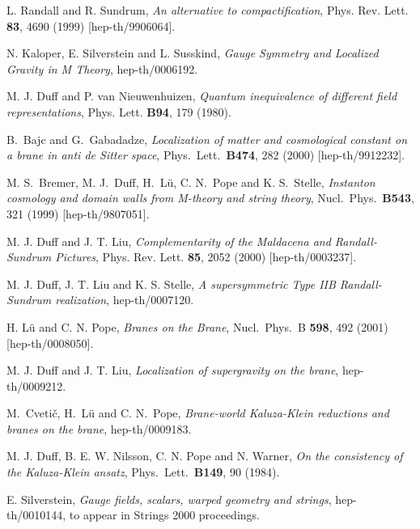\documentclass[a4paper,12pt]{article}
\begin{document}
\begin{thebibliography}{99}


L. Randall and R. Sundrum,
{\sl An alternative to compactification},
Phys. Rev. Lett. {\bf 83}, 4690 (1999) [hep-th/9906064].

N. Kaloper, E. Silverstein and L. Susskind,
{\sl Gauge Symmetry and Localized Gravity in M Theory},
hep-th/0006192.

M. J. Duff and P. van Nieuwenhuizen,
{\sl Quantum inequivalence of different field representations},
Phys. Lett. {\bf B94}, 179 (1980).

B.~Bajc and G.~Gabadadze,
{\sl Localization of matter and cosmological constant on a brane in anti
de Sitter space},
Phys.\ Lett.\ {\bf B474}, 282 (2000) [hep-th/9912232].

M. S.~Bremer, M. J.~Duff, H.~L\"u, C. N.~Pope and K. S.~Stelle,
{\sl Instanton cosmology and domain walls from M-theory and string theory},
Nucl.\ Phys.\ {\bf B543}, 321 (1999) [hep-th/9807051].

M. J. Duff and J. T. Liu,
{\sl Complementarity of the Maldacena and Randall-Sundrum Pictures},
Phys. Rev. Lett. {\bf 85}, 2052 (2000) [hep-th/0003237].

M. J. Duff, J. T. Liu and K. S. Stelle,
{\sl A supersymmetric Type IIB Randall-Sundrum realization},
hep-th/0007120.

H. L\"u and C. N. Pope, {\sl Branes on the Brane},
Nucl.\ Phys.\ B {\bf 598}, 492 (2001) [hep-th/0008050].

M. J. Duff and J. T. Liu,
{\sl Localization of supergravity on the brane},
hep-th/0009212.

M.~Cveti\v{c}, H.~L\"u and C. N.~Pope,
{\sl Brane-world Kaluza-Klein reductions and branes on the brane},
hep-th/0009183.

M. J. Duff, B. E. W. Nilsson, C. N. Pope and N. Warner,
{\sl On the consistency of the Kaluza-Klein ansatz},
Phys.\ Lett.\ {\bf B149}, 90 (1984).

E. Silverstein,
{\sl Gauge fields, scalars, warped geometry and strings},
hep-th/0010144, to appear in Strings 2000 proceedings.

\end{thebibliography}
\end{document}
